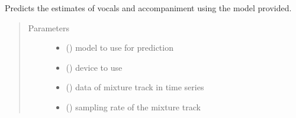\documentclass[letterpaper,10pt,english,openany,oneside]{sphinxmanual}
\begin{document}

\begin{fulllineitems}
\label{\detokenize{docs/source/train:train.train_model.main}}
\end{fulllineitems}


\begin{fulllineitems}
\label{\detokenize{docs/source/train:train.train_model.predict}}
Predicts the estimates of vocals and accompaniment using the model provided.
\begin{quote}\begin{description}
\item[{Parameters}] \leavevmode\begin{itemize}
\item {} 
 ({\hyperref[\detokenize{docs/source/train:train.model.Generalised_Recurrent_Model}]{}}) \textendash{} model to use for prediction

\item {} 
 () \textendash{} device to use

\item {} 
 (\sphinxstyleliteralemphasis{\sphinxupquote{(}}\sphinxstyleliteralemphasis{\sphinxupquote{, }}\sphinxstyleliteralemphasis{\sphinxupquote{)}}) \textendash{} data of mixture track in time series

\item {} 
 () \textendash{} sampling rate of the mixture track


\end{itemize}
\end{description}
\end{quote}
\end{fulllineitems}
\end{document}
